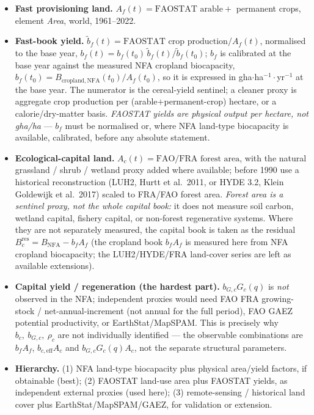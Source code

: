 \documentclass[11pt]{article}
\begin{document}
\begin{itemize}
\item \textbf{Fast provisioning land.} $A_f(t)=\text{FAOSTAT arable}+$ permanent crops, element \emph{Area},
world, 1961--2022.
\item \textbf{Fast-book yield.} $\tilde b_f(t)=\text{FAOSTAT crop production}/A_f(t)$, normalised to the base year,
$b_f(t)=b_f(t_0)\,\tilde b_f(t)/\tilde b_f(t_0)$; $b_f$ is calibrated at the base year against the measured NFA
cropland biocapacity, $b_f(t_0)=B_{\mathrm{cropland,NFA}}(t_0)/A_f(t_0)$, so it is expressed in
gha$\cdot$ha$^{-1}\cdot$yr$^{-1}$ at the base year. The numerator is the cereal-yield sentinel; a cleaner proxy is
aggregate crop production per (arable$+$permanent-crop) hectare, or a calorie/dry-matter basis.
\emph{FAOSTAT yields are physical output per hectare, not gha/ha} --- $b_f$ must be normalised or, where NFA
land-type biocapacity is available, calibrated, before any absolute statement.
\item \textbf{Ecological-capital land.} $A_c(t)=\text{FAO/FRA forest area}$, with the natural grassland / shrub /
wetland proxy added where available; before 1990 use a historical reconstruction (LUH2, Hurtt et al.\ 2011, or
HYDE 3.2, Klein Goldewijk et al.\ 2017) scaled to FRA/FAO forest area. \emph{Forest area is a sentinel proxy, not
the whole capital book:} it does not measure soil carbon, wetland capital, fishery capital, or non-forest
regenerative systems. Where they are not separately measured, the capital book is taken as the residual
$B_c^{\mathrm{res}}=B_{\mathrm{NFA}}-b_fA_f$ (the cropland book $b_fA_f$ is measured here from NFA cropland
biocapacity; the LUH2/HYDE/FRA land-cover series are left as available extensions).
\item \textbf{Capital yield / regeneration (the hardest part).} $b_{G,c}G_c(q)$ is \emph{not} observed in the
NFA; independent proxies would need FAO FRA growing-stock / net-annual-increment (not annual for the full period),
FAO GAEZ potential productivity, or EarthStat/MapSPAM. This is precisely why $b_c,\ b_{G,c},\ \rho_c$ are not
individually identified --- the observable combinations are $b_fA_f$, $b_{c,\mathrm{eff}}A_c$ and $b_{G,c}G_c(q)A_c$,
not the separate structural parameters.
\item \textbf{Hierarchy.} (1) NFA land-type biocapacity plus physical area/yield factors, if obtainable (best);
(2) FAOSTAT land-use area plus FAOSTAT yields, as independent external proxies (used here); (3) remote-sensing /
historical land cover plus EarthStat/MapSPAM/GAEZ, for validation or extension.
\end{itemize}
\end{document}
